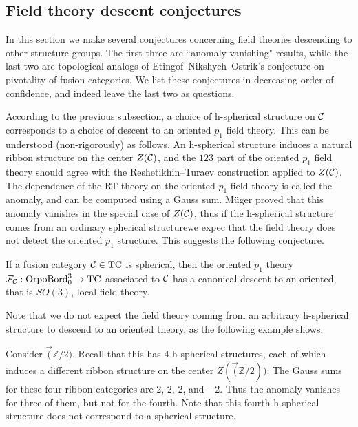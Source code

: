 \documentclass{amsart}
\begin{document}
\subsection{Field theory descent conjectures}

In this section we make several conjectures concerning field theories descending to other structure groups.  The first three are ``anomaly vanishing" results, while the last two are topological analogs of Etingof--Nikshych--Ostrik's conjecture on pivotality of fusion categories.  We list these conjectures in decreasing order of confidence, and indeed leave the last two as questions.

According to the previous subsection, a choice of h-spherical structure on $\mathcal C$ corresponds to a choice of descent to an oriented $p_1$ field theory.  This can be understood (non-rigorously) as follows.  An h-spherical structure induces a natural ribbon structure on the center $Z(\mathcal C)$, and the $123$ part of the oriented $p_1$ field theory should agree with the Reshetikhin--Turaev construction applied to $Z(\mathcal C)$.  The dependence of the RT theory on the oriented $p_1$ field theory is called the anomaly, and can be computed using a Gauss sum.  M\"uger proved that this anomaly vanishes in the special case of $Z(\mathcal C)$, thus if the h-spherical structure comes from an ordinary spherical structurewe expec that the field theory does not detect the oriented $p_1$ structure.  This suggests the following conjecture.

\begin{conjecture}
If a fusion category $\mathcal C \in \mathrm{TC}$ is spherical, then the oriented $p_1$ theory $\mathcal F_{\mathcal C} : \mathrm{OrpoBord}_0^3 \rightarrow \mathrm{TC}$ associated to $\mathcal C$ has a canonical descent to an oriented, that is $SO(3)$, local field theory.
\end{conjecture}

Note that we do not expect the field theory coming from an arbitrary h-spherical structure to descend to an oriented theory, as the following example shows.

\begin{example}
Consider $\Vec(\mathbb{Z}/2)$.  Recall that this has $4$ h-spherical structures, each of which induces a different ribbon structure on the center $Z(\Vec(\mathbb{Z}/2))$.  The Gauss sums for these four ribbon categories are $2$, $2$, $2$, and $-2$.  Thus the anomaly vanishes for three of them, but not for the fourth.  Note that this fourth h-spherical structure does not correspond to a spherical structure.  
\end{example}
\end{document}
